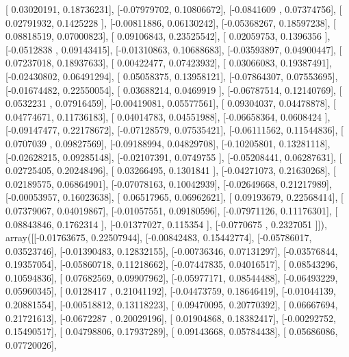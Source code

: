 \documentclass{article}
\begin{document}
       [ 0.03020191,  0.18736231],
       [-0.07979702,  0.10806672],
       [-0.0841609 ,  0.07374756],
       [ 0.02791932,  0.1425228 ],
       [-0.00811886,  0.06130242],
       [-0.05368267,  0.18597238],
       [ 0.08818519,  0.07000823],
       [ 0.09106843,  0.23525542],
       [ 0.02059753,  0.1396356 ],
       [-0.0512838 ,  0.09143415],
       [-0.01310863,  0.10688683],
       [-0.03593897,  0.04900447],
       [ 0.07237018,  0.18937633],
       [ 0.00422477,  0.07423932],
       [ 0.03066083,  0.19387491],
       [-0.02430802,  0.06491294],
       [ 0.05058375,  0.13958121],
       [-0.07864307,  0.07553695],
       [-0.01674482,  0.22550054],
       [ 0.03688214,  0.0469919 ],
       [-0.06787514,  0.12140769],
       [ 0.0532231 ,  0.07916459],
       [-0.00419081,  0.05577561],
       [ 0.09304037,  0.04478878],
       [ 0.04774671,  0.11736183],
       [ 0.04014783,  0.04551988],
       [-0.06658364,  0.0608424 ],
       [-0.09147477,  0.22178672],
       [-0.07128579,  0.07535421],
       [-0.06111562,  0.11544836],
       [ 0.0707039 ,  0.09827569],
       [-0.09188994,  0.04829708],
       [-0.10205801,  0.13281118],
       [-0.02628215,  0.09285148],
       [-0.02107391,  0.0749755 ],
       [-0.05208441,  0.06287631],
       [ 0.02725405,  0.20248496],
       [ 0.03266495,  0.1301841 ],
       [-0.04271073,  0.21630268],
       [ 0.02189575,  0.06864901],
       [-0.07078163,  0.10042939],
       [-0.02649668,  0.21217989],
       [-0.00053957,  0.16023638],
       [ 0.06517965,  0.06962621],
       [ 0.09193679,  0.22568414],
       [ 0.07379067,  0.04019867],
       [-0.01057551,  0.09180596],
       [-0.07971126,  0.11176301],
       [ 0.08843846,  0.1762314 ],
       [-0.01377027,  0.115354  ],
       [-0.0770675 ,  0.2327051 ]]), array([[-0.01763675,  0.22507944],
       [-0.00842483,  0.15442774],
       [-0.05786017,  0.03523746],
       [-0.01390483,  0.12832155],
       [-0.00736346,  0.07131297],
       [-0.03576844,  0.19357054],
       [-0.05860718,  0.11218662],
       [-0.07447835,  0.04016517],
       [ 0.08543296,  0.10594836],
       [ 0.07682569,  0.09907962],
       [-0.05977171,  0.08544488],
       [-0.06493229,  0.05960345],
       [ 0.0128417 ,  0.21041192],
       [-0.04473759,  0.18646419],
       [-0.01044139,  0.20881554],
       [-0.00518812,  0.13118223],
       [ 0.09470095,  0.20770392],
       [ 0.06667694,  0.21721613],
       [-0.0672287 ,  0.20029196],
       [ 0.01904868,  0.18382417],
       [-0.00292752,  0.15490517],
       [ 0.04798806,  0.17937289],
       [ 0.09143668,  0.05784438],
       [ 0.05686086,  0.07720026],
\end{document}

